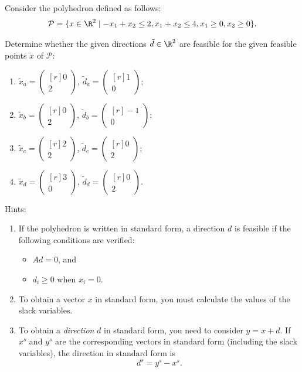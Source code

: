 
Consider the polyhedron defined as follows:
\[
    \mathcal{P} = \{x \in \R^2 \mid -x_1 + x_2 \leq 2, x_1 + x_2 \leq 4, x_1 \geq 0, x_2 \geq 0\}.
\]

Determine whether the given directions $\tilde{d} \in \R^2$  are feasible for the given feasible points $\tilde{x}$ of $\mathcal{P}$:
\begin{enumerate}
    \item $\tilde{x}_a = \begin{pmatrix*}[r] 0 \\ 2 \end{pmatrix*}$, $\tilde{d}_a = \begin{pmatrix*}[r] 1 \\ 0 \end{pmatrix*};$
    \item $\tilde{x}_b = \begin{pmatrix*}[r] 0 \\ 2 \end{pmatrix*}$, $\tilde{d}_b = \begin{pmatrix*}[r] -1 \\ 0 \end{pmatrix*};$
    \item $\tilde{x}_c = \begin{pmatrix*}[r] 2 \\ 2 \end{pmatrix*}$, $\tilde{d}_c = \begin{pmatrix*}[r] 0 \\ 2 \end{pmatrix*};$
    \item $\tilde{x}_d = \begin{pmatrix*}[r] 3 \\ 0 \end{pmatrix*}$, $\tilde{d}_d = \begin{pmatrix*}[r] 0 \\ 2 \end{pmatrix*}.$
\end{enumerate}

Hints:
\begin{enumerate}
 \item If the polyhedron is written in standard form, a direction $d$ is feasible if the
    following conditions are verified:
    \begin{itemize}
         \item  $Ad = 0$, and
         \item  $d_i \geq 0$ when $x_i = 0$.
         \end{itemize}
 \item To obtain a vector $x$ in standard form, you must calculate the values of the slack variables.
 \item To obtain a \emph{direction} $d$ in standard form, you need to consider $y = x + d$. If $x^s$ and $y^s$ are
     the corresponding vectors in standard form (including the slack variables), the direction in standard form is
     $$d^s = y^s - x^s.$$
 \end{enumerate}


